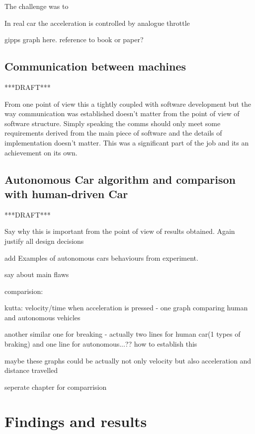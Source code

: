 \documentclass[11pt,english]{article}
\begin{document}
The challenge was to 


In real car the acceleration is controlled by analogue throttle


gipps graph here. reference to book or paper?






\subsection{Communication between machines}

***DRAFT***

From one point of view this a tightly coupled with software development but the way
communication was established doesn’t matter from the point of view of software structure.
Simply speaking the comms should only meet some requirements derived from
the main piece of software and the details of implementation doesn’t matter. This was
a significant part of the job and its an achievement on its own.

\subsection{Autonomous Car algorithm and comparison with human-driven Car}

***DRAFT***



Say why this is important from the point of view of results obtained. Again justify all
design decisions


add Examples of autonomous cars behaviours from experiment. 

say about main flaws


comparision:


kutta:
velocity/time when acceleration is pressed  - one graph comparing human and autonomous vehicles



another similar one for breaking - actually two lines for human car(1 types of braking) and one line for autonomous...?? how to establish this

maybe these graphs could be actually not only velocity but also acceleration and distance travelled




seperate chapter for comparrision



\section{Findings and results}
\end{document}
